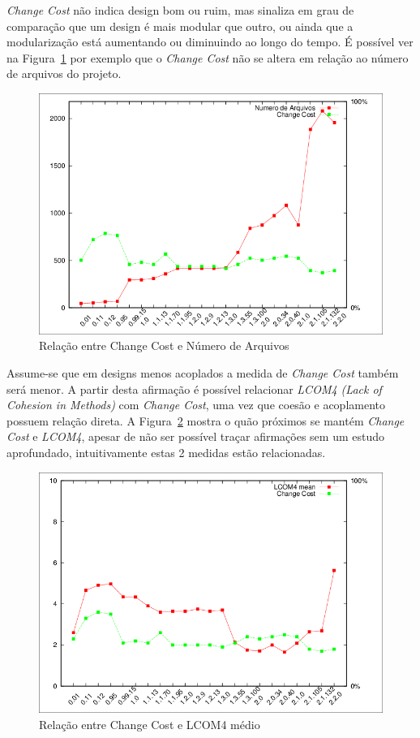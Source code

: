 \documentclass[conference]{IEEEtran}
\begin{document}
{\it Change Cost} não indica design bom ou ruim, mas sinaliza em grau de
comparação que um design é mais modular que outro, ou ainda que a
modularização está aumentando ou diminuindo ao longo do tempo. É possível ver na
Figura~\ref{fig:files} por exemplo que o {\it Change Cost} não se altera em
relação ao número de arquivos do projeto.

\begin{figure}[h]
\center
\includegraphics[scale=0.3]{plot-files.png}
\caption{Relação entre Change Cost e Número de Arquivos}
\label{fig:files}
\end{figure}

Assume-se que em designs menos acoplados a medida de {\it Change Cost} também
será menor. A partir desta afirmação é possível relacionar {\it LCOM4 (Lack of
Cohesion in Methods)} com {\it Change Cost}, uma vez que coesão e acoplamento
possuem relação direta. A Figura~\ref{fig:lcom4} mostra o quão próximos se
mantém {\it Change Cost} e {\it LCOM4}, apesar de não ser possível traçar
afirmações sem um estudo aprofundado, intuitivamente estas 2 medidas estão
relacionadas.

\begin{figure}[h]
\center
\includegraphics[scale=0.3]{plot-lcom4.png}
\caption{Relação entre Change Cost e LCOM4 médio}
\label{fig:lcom4}
\end{figure}
\end{document}
